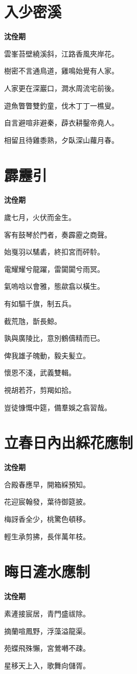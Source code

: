 \documentclass[12pt,a4paper]{ctexbook}
\begin{document}
\section{入少密溪}
\textbf{沈佺期}\par\vspace{0.5em}
雲峯苔壁繞溪斜，江路香風夾岸花。\par
樹密不言通鳥道，雞鳴始覺有人家。\par
人家更在深巖口，澗水周流宅前後。\par
遊魚瞥瞥雙釣童，伐木丁丁一樵叟。\par
自言避喧非避秦，薜衣耕鑿帝堯人。\par
相留且待雞黍熟，夕臥深山蘿月春。\par

\section{霹靂引}
\textbf{沈佺期}\par\vspace{0.5em}
歲七月，火伏而金生。\par
客有鼓琴於門者，奏霹靂之商聲。\par
始戛羽以騞砉，終扣宮而砰駖。\par
電耀耀兮龍躍，雷闐闐兮雨冥。\par
氣嗚唅以會雅，態歘翕以橫生。\par
有如驅千旗，制五兵。\par
截荒虺，斮長鯨。\par
孰與廣陵比，意別鶴儔精而已。\par
俾我雄子魄動，毅夫髪立。\par
懷恩不淺，武義雙輯。\par
視胡若芥，剪羯如拾。\par
豈徒慷慨中筵，備羣娛之翕習哉。\par

\section{立春日內出綵花應制}
\textbf{沈佺期}\par\vspace{0.5em}
合殿春應早，開箱綵預知。\par
花迎宸翰發，葉待御筵披。\par
梅訝香全少，桃驚色頓移。\par
輕生承剪拂，長伴萬年枝。\par

\section{晦日滻水應制}
\textbf{沈佺期}\par\vspace{0.5em}
素滻接宸居，青門盛祓除。\par
摘蘭喧鳳野，浮藻溢龍渠。\par
苑蝶飛殊懶，宮鶯囀不疎。\par
星移天上入，歌舞向儲胥。\par
\end{document}

